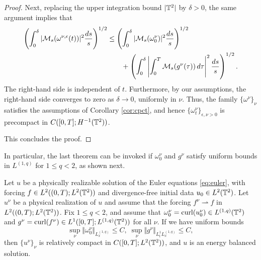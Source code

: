 \documentclass[reqno,12pt]{amsart}
\DeclareMathOperator{\curl}{curl}
\begin{document}
\begin{proof}
Next, replacing the upper integration bound $|\mathbb{T}^2|$ by $\delta > 0$, the same argument implies that
\begin{align*}
\left(\int_0^\delta |\mathcal{M}_s (\omega^{\nu,\epsilon}(t))|^2 \frac{ds}{s} \right)^{1/2}
&\le
\left(\int_0^\delta |\mathcal{M}_s(\omega^\nu_0)|^2 \frac{ds}{s}\right)^{1/2}
\\
&\qquad +
\left(\int_0^\delta \left| \int_0^T \mathcal{M}_s(g^\nu(\tau))\, d\tau \right|^2 \frac{ds}{s} \right)^{1/2}.
\end{align*}
The right-hand side is independent of $t$. Furthermore, by our assumptions, the right-hand side converges to zero as $\delta \to 0$, uniformly in $\nu$. Thus, the family $\{\omega^{\nu}\}_{\nu}$ satisfies the assumptions of Corollary \ref{cor:cpct}, and hence $\{\omega_t^{\nu}\}_{\epsilon, \nu > 0}$ is precompact in $C([0,T];H^{-1}(\mathbb{T}^2))$.

This concludes the proof.
\end{proof}

In particular, the last theorem can be invoked if $\omega^\nu_0$ and $g^\nu$ satisfy uniform bounds in $L^{(1,q)}$ for $1\le q<2$, as shown next.

\begin{corollary} \label{cor:L1q}
   Let $u$ be a physically realizable solution of the Euler equations \eqref{eq:euler}, with forcing $f\in L^2((0,T);L^2(\mathbb{T}^2))$ and divergence-free initial data $u_0 \in L^2(\mathbb{T}^2)$. Let $u^\nu$ be a physical realization of $u$ and assume that the forcing $f^\nu \rightharpoonup f$ in $L^2((0,T);L^2(\mathbb{T}^2))$. Fix $1\le q <2$, and assume that $\omega_0^\nu = \curl(u^\nu_0)\in L^{(1,q)}(\T^2)$ and $g^\nu = \curl(f^\nu) \in L^1([0,T];L^{(1,q)}(\T^2))$ for all $\nu$. If we have uniform bounds
  \[
  \sup_{\nu} \Vert \omega_0^\nu \Vert_{L^{(1,q)}_x}\le C, \;  \sup_{\nu} \Vert g^\nu \Vert_{L^1_tL^{(1,q)}_x} \le C,
  \]
  then $\{u^\nu\}_{\nu}$ is relatively compact in $C([0,T];L^2(\mathbb{T}^2))$, and $u$ is an energy balanced solution.
\end{corollary}
\end{document}
